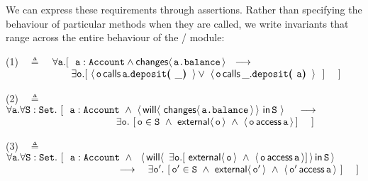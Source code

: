  
We can  express these  requirements  %
through \Chainmail assertions.  Rather than %
specifying the behaviour of particular methods when they are called, we
write  invariants   that range across the entire behaviour of the
/  module:
\vspace{.2cm}


(1)\ \  $\triangleq$\ \ $\forall \prg{a}.[\ \ \prg{a}:\prg{Account} \wedge \Changes{\prg{a.balance}}  \ \    
    \longrightarrow \ \    \hfill$ \\
  $\strut \hspace{2.3cm} 
  \exists \prg{o}. [\    \Calls{\prg{o}}{\prg{deposit}}{\prg{a}}{\_} \vee\  \Calls{\prg{o}}{\prg{deposit}}{\_}{\prg{a}}\  \ ] \ \ \ \ ] \hfill $

\vspace{.4cm}

    (2)\ \  $\triangleq$\ \ $\forall {\mbox{\tt{a}}}.\forall {\mbox{\tt{S}}}:{\mbox{\tt{Set}}}.\ [  \ \  {\mbox{\tt{a}}}:{\mbox{\tt{Account}}}\ \wedge \  \langle\,  {\mathsf{will}}\langle \,\,{\mathsf{changes}}\langle\,{\mbox{\tt{a.balance}}}\,\rangle\,\rangle \,\, \mathsf{in}\, {\mbox{\tt{S}}}\,\, \rangle\ \ \   \
    \longrightarrow$ \\
 $\strut \hspace{3.9cm} \hfill \exists \prg{o}.\ [\, \prg{o}\in \prg{S}\ \wedge\  \External{\prg{o}}  \ \wedge \ \CanAccess{\prg{o}}{\prg{a}} \, ] \ \ \ \ ]$
\vspace{.4cm} 
 
     (3)\ \  $\triangleq$\ \ $\forall {\mbox{\tt{a}}}.\forall {\mbox{\tt{S}}}:{\mbox{\tt{Set}}}.\ [ \ \  {\mbox{\tt{a}}}:{\mbox{\tt{Account}}}\ \wedge \ \ {\langle\, {\mathsf{will}}\langle \,\ \exists {\mbox{\tt{o}}}.[\ {\mathsf{external}}\langle\, {\mbox{\tt{o}}}\, \rangle \ \wedge\ \langle\, {\mbox{\tt{o}}}\, \mathsf{access}\, {\mbox{\tt{a}}}\, \rangle]\,\rangle\, \mathsf{in}\, {{\mbox{\tt{S}}}}\, \rangle}$ \\  
 $\strut \hspace{3.9cm} \hfill   \longrightarrow \ \ \ \exists \prg{o}'.\ [\, \prg{o}'\in \prg{S}\  \wedge  \ \External{\prg{o}'}  \ \wedge \ \CanAccess{\prg{o}'}{\prg{a}}   \ ] \ \ \ \ ]$

\vspace{.2cm}

